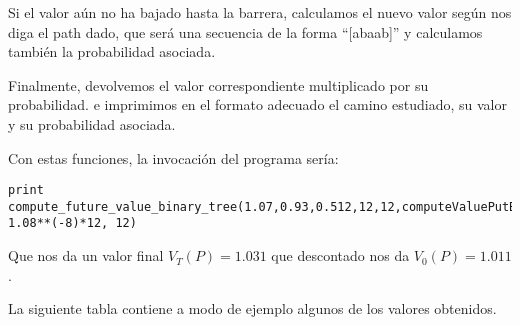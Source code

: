 \begin{problem}[1]
Si el valor aún no ha bajado hasta la barrera, calculamos el nuevo valor según nos diga el path dado, que será una secuencia de la forma ``[abaab]'' y calculamos también la probabilidad asociada.

Finalmente, devolvemos el valor correspondiente multiplicado por su probabilidad. e imprimimos en el formato adecuado el camino estudiado, su valor y su probabilidad asociada.

Con estas funciones, la invocación del programa sería:
\begin{lstlisting}
print compute_future_value_binary_tree(1.07,0.93,0.512,12,12,computeValuePutBarreraDown_Out, 1.08**(-8)*12, 12)
\end{lstlisting}

Que nos da un valor final $V_T(P)=1.031$ que descontado nos da $V_0(P)=1.011$.

La siguiente tabla contiene a modo de ejemplo algunos de los valores obtenidos.


\end{problem}
